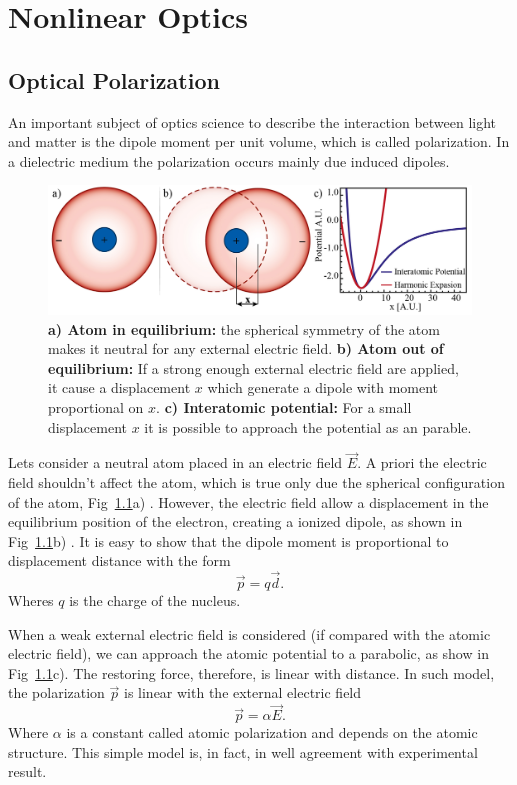 \chapter{Nonlinear Optics}

\section{Optical Polarization}
An important subject of optics science to describe the interaction between light and matter is the dipole moment per unit volume, which is called polarization. In a dielectric medium the polarization occurs mainly due induced dipoles.

\begin{figure}[h!]
    \centering
    \includegraphics[width = 16cm]{figuras/Dissertation_atomic_polarization.jpg}
    \caption{\textbf{a) Atom in equilibrium:} the spherical symmetry of the atom makes it neutral for any external electric field. \textbf{b) Atom out of equilibrium:} If a strong enough external electric field are applied, it cause a displacement $x$ which generate a dipole with moment proportional on $x$. \textbf{c) Interatomic potential:} For a small displacement $x$ it is possible to approach the potential as an parable.}
    \label{fig:polarization}
\end{figure}
Lets consider a neutral atom placed in an electric field $\vec{E}$. A priori the electric field shouldn't affect the atom, which is true only due the spherical configuration of the atom, Fig~\ref{fig:polarization}a)
. However, the electric field allow a displacement in the equilibrium position of the electron, creating a ionized dipole, as shown in Fig~\ref{fig:polarization}b)
. It is easy to show that the dipole moment is proportional to displacement distance with the form
\begin{equation}
    \vec{p} = q\vec{d}.
\end{equation}
Wheres $q$ is the charge of the nucleus. 

When a weak external electric field is considered (if compared with the atomic electric field), we can approach the atomic potential to a parabolic, as show in Fig~\ref{fig:polarization}c). The restoring force, therefore, is linear with distance. In such model, the polarization $\vec{p}$ is linear with the external electric field
\begin{equation}
    \vec{p} = \alpha \vec{E}.
\end{equation}
Where $\alpha$ is a constant called atomic polarization and depends on the atomic structure. This simple model is, in fact, in well agreement with experimental result.  

